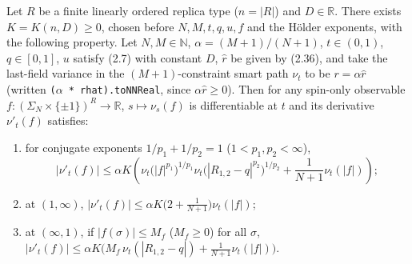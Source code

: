 \begin{proposition}[Proposition 2.3.6: smart-path derivative bound at $r=\alpha\widehat r$, (2.66)]\label{prop:sg-tal:perceptron-cavity-prop-236}
  \leanok
Let $R$ be a finite linearly ordered replica type ($n=|R|$) and $D\in\mathbb R$. There exists $K=K(n,D)\ge0$, chosen before $N,M,t,q,u,f$ and the
H\"older exponents, with the following property. Let $N,M\in\mathbb N$, $\alpha=(M+1)/(N+1)$, $t\in(0,1)$, $q\in[0,1]$, $u$ satisfy (2.7) with
constant $D$, $\widehat r$ be given by (2.36), and take the last-field variance in the $(M+1)$-constraint smart path $\nu_t$ to be $r=\alpha\widehat r$
(written \texttt{($\alpha$ * rhat).toNNReal}, since $\alpha\widehat r\ge0$). Then for any spin-only observable $f:(\Sigma_N\times\{\pm1\})^R\to\mathbb R$,
$s\mapsto\nu_s(f)$ is differentiable at $t$ and its derivative $\nu'_t(f)$ satisfies:
\begin{enumerate}
\item for conjugate exponents $1/p_1+1/p_2=1$ ($1<p_1,p_2<\infty$),
\[
 |\nu'_t(f)|\le\alpha K\left(\nu_t\bigl(|f|^{p_1}\bigr)^{1/p_1}\nu_t\bigl(|R_{1,2}-q|^{p_2}\bigr)^{1/p_2}+\frac{1}{N+1}\nu_t(|f|)\right);
\]
\item at $(1,\infty)$, $|\nu'_t(f)|\le\alpha K\bigl(2+\frac{1}{N+1}\bigr)\nu_t(|f|)$;
\item at $(\infty,1)$, if $|f(\sigma)|\le M_f$ ($M_f\ge0$) for all $\sigma$, $|\nu'_t(f)|\le\alpha K\bigl(M_f\,\nu_t(|R_{1,2}-q|)+\frac{1}{N+1}\nu_t(|f|)\bigr)$.
\end{enumerate}
\end{proposition}
